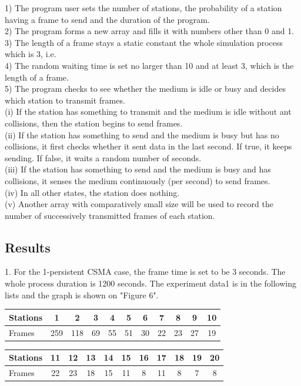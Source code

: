 \documentclass[11pt,a4paper]{report}
\begin{document}
1) The program user sets the number of stations, the probability of a station having a frame to send and the duration of the program. \\
2) The program forms a new array and fills it with numbers other than 0 and 1. \\
3) The length of a frame stays a static constant the whole simulation process which is 3, i.e. \\
4) The random waiting time is set no larger than 10 and at least 3, which is the length of a frame. \\
5) The program checks to see whether the medium is idle or busy and decides which station to transmit frames. \\
(i) If the station has something to transmit and the medium is idle without ant collisions, then the station begins to send frames. \\
(ii) If the station has something to send and the medium is busy but has no collisions, it first checks whether it sent data in the last second. If true, it keeps sending. If false, it waits a random number of seconds. \\
(iii) If the station has something to send and the medium is busy and has collisions, it senses the medium continuously (per second) to send frames. \\
(iv) In all other states, the station does nothing. \\
(v) Another array with comparatively small size will be used to record the number of successively transmitted frames of each station.

\subsection*{Results}
1. For the 1-persistent CSMA case, the frame time is set to be 3 seconds. The whole process duration is 1200 seconds. The experiment data1 is in the following lists and the graph is shown on "Figure 6".

\begin{table}[htbp]
\begin{tabular}{lcccccccccc}
\toprule
Stations & 1 & 2 & 3 & 4 & 5 & 6 & 7 & 8 & 9 & 10 \\
\midrule
Frames & 259 & 118 & 69 & 55 & 51 & 30 & 22 & 23 & 27 & 19 \\
\bottomrule
\end{tabular}
\end{table}

\begin{table}[htbp]
\begin{tabular}{lcccccccccc}
\toprule
Stations & 11 & 12 & 13  & 14 & 15 & 16 & 17 & 18 & 19 & 20 \\
\midrule
Frames & 22 & 23 & 18 & 15 & 11 & 8 & 11 & 8 & 7 & 8 \\
\bottomrule
\end{tabular}
\end{table}
\end{document}
